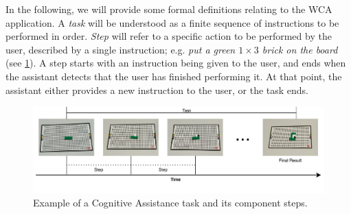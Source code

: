 \documentclass[10pt,letterpaper]{article}
\providecommand{\DIFaddtex}[1]{#1} %
\providecommand{\DIFdeltex}[1]{} %
\providecommand{\DIFaddbegin}{\protect\color{blue}} %
\providecommand{\DIFaddend}{\protect\color{black}} %
\providecommand{\DIFdelbegin}{\protect\color{red}} %
\providecommand{\DIFdelend}{\protect\color{black}} %
\providecommand{\DIFaddFL}[1]{\DIFadd{#1}} %
\providecommand{\DIFadd}[1]{\texorpdfstring{\DIFaddtex{#1}}{#1}} %
\providecommand{\DIFdel}[1]{\texorpdfstring{\DIFdeltex{#1}}{}} %
\newcommand{\DIFscaledelfig}{0.5}
\newlength{\DIFdelgraphicswidth} %
\newlength{\DIFdelgraphicsheight} %
\newcommand{\DIFaddincludegraphics}[2][]{{\color{blue}\fbox{\DIFOincludegraphics[#1]{#2}}}} %
\newcommand{\DIFdelincludegraphics}[2][]{%
\sbox{\DIFdelgraphicsbox}{\DIFOincludegraphics[#1]{#2}}%
\settoboxwidth{\DIFdelgraphicswidth}{\DIFdelgraphicsbox} %
\settoboxtotalheight{\DIFdelgraphicsheight}{\DIFdelgraphicsbox} %
\scalebox{\DIFscaledelfig}{%
\parbox[b]{\DIFdelgraphicswidth}{\usebox{\DIFdelgraphicsbox}\\[-\baselineskip] \rule{\DIFdelgraphicswidth}{0em}}\llap{\resizebox{\DIFdelgraphicswidth}{\DIFdelgraphicsheight}{%
\setlength{\unitlength}{\DIFdelgraphicswidth}%
\begin{picture}(1,1)%
\thicklines\linethickness{2pt} %
{\color[rgb]{1,0,0}\put(0,0){\framebox(1,1){}}}%
{\color[rgb]{1,0,0}\put(0,0){\line( 1,1){1}}}%
{\color[rgb]{1,0,0}\put(0,1){\line(1,-1){1}}}%
\end{picture}%
}\hspace*{3pt}}} %
} %
\DeclareRobustCommand{\DIFaddbegin}{\DIFOaddbegin \let\includegraphics\DIFaddincludegraphics} %
\DeclareRobustCommand{\DIFaddend}{\DIFOaddend \let\includegraphics\DIFOincludegraphics} %
\DeclareRobustCommand{\DIFdelbegin}{\DIFOdelbegin \let\includegraphics\DIFdelincludegraphics} %
\DeclareRobustCommand{\DIFdelend}{\DIFOaddend \let\includegraphics\DIFOincludegraphics} %
\begin{document}
\DIFdelbegin \DIFdel{In more formal terms, we can provide definitions for \emph{task}, \emph{subtask}, and \emph{step} in such an applicationas:
}%
\DIFdelend %
\DIFaddbegin \DIFadd{In the following, we will provide some formal definitions relating to the WCA application.
}\DIFaddend A \emph{task} will be understood as a finite sequence of instructions to be performed in order.
\emph{\DIFdelbegin \DIFdel{Subtask}\DIFdelend \DIFaddbegin \DIFadd{Step}\DIFaddend } will refer to a specific action to be performed by the user, described by a single instruction\DIFaddbegin \DIFadd{; e.g. \emph{put a green \(1 \times 3\) brick on the board} (see \cref{fig:task:steps}).
A step starts with an instruction being }\DIFaddend given to the user\DIFdelbegin \DIFdel{.
  The user then proceeds to perform the subtask specified by the instruction, while the cognitive assistant is continuously sampling the subtask state at specified intervals.
While the subtask remains unfinished, the results of the processing of the sampled inputs are discarded.
  Once the user finishes the required action, the next sample taken will contain a valid input, and thus the cognitive assistant will provide }\DIFdelend \DIFaddbegin \DIFadd{, and ends when the assistant detects that the user has finished performing it.
At that point, the assistant either provides }\DIFaddend a new instruction \DIFdelbegin \DIFdel{. 
  This finishes the current step and potentially begins a new one if there remain instructions to be performed in the task.
}%
\DIFdelend \DIFaddbegin \DIFadd{to the user, or the task ends.
}\DIFaddend 

\DIFaddbegin \begin{figure}[h]
  \centering
  \includegraphics[width=.8\textwidth]{images/step_task_description.pdf}
  \caption{\DIFaddFL{Example of a Cognitive Assistance task and its component steps.}}\label{fig:task:steps}
\end{figure}
\end{document}
